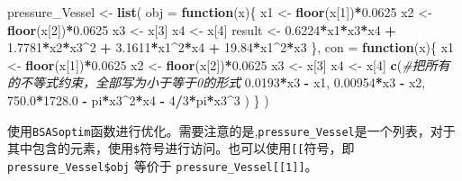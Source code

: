 \documentclass[]{ctexbook}
\newenvironment{Shaded}{\begin{snugshade}}{\end{snugshade}}
\newcommand{\KeywordTok}[1]{\textcolor[rgb]{0.13,0.29,0.53}{\textbf{#1}}}
\newcommand{\DataTypeTok}[1]{\textcolor[rgb]{0.13,0.29,0.53}{#1}}
\newcommand{\DecValTok}[1]{\textcolor[rgb]{0.00,0.00,0.81}{#1}}
\newcommand{\FloatTok}[1]{\textcolor[rgb]{0.00,0.00,0.81}{#1}}
\newcommand{\StringTok}[1]{\textcolor[rgb]{0.31,0.60,0.02}{#1}}
\newcommand{\CommentTok}[1]{\textcolor[rgb]{0.56,0.35,0.01}{\textit{#1}}}
\newcommand{\ControlFlowTok}[1]{\textcolor[rgb]{0.13,0.29,0.53}{\textbf{#1}}}
\newcommand{\OperatorTok}[1]{\textcolor[rgb]{0.81,0.36,0.00}{\textbf{#1}}}
\newcommand{\NormalTok}[1]{#1}
\begin{document}
\begin{Shaded}
\begin{Highlighting}[]
\NormalTok{pressure_Vessel <-}\StringTok{ }\KeywordTok{list}\NormalTok{(}
  \DataTypeTok{obj =} \ControlFlowTok{function}\NormalTok{(x)\{}
\NormalTok{    x1 <-}\StringTok{ }\KeywordTok{floor}\NormalTok{(x[}\DecValTok{1}\NormalTok{])}\OperatorTok{*}\FloatTok{0.0625}
\NormalTok{    x2 <-}\StringTok{ }\KeywordTok{floor}\NormalTok{(x[}\DecValTok{2}\NormalTok{])}\OperatorTok{*}\FloatTok{0.0625}
\NormalTok{    x3 <-}\StringTok{ }\NormalTok{x[}\DecValTok{3}\NormalTok{]}
\NormalTok{    x4 <-}\StringTok{ }\NormalTok{x[}\DecValTok{4}\NormalTok{]}
\NormalTok{    result <-}\StringTok{ }\FloatTok{0.6224}\OperatorTok{*}\NormalTok{x1}\OperatorTok{*}\NormalTok{x3}\OperatorTok{*}\NormalTok{x4 }\OperatorTok{+}\StringTok{ }
\StringTok{      }\FloatTok{1.7781}\OperatorTok{*}\NormalTok{x2}\OperatorTok{*}\NormalTok{x3}\OperatorTok{^}\DecValTok{2} \OperatorTok{+}
\StringTok{      }\FloatTok{3.1611}\OperatorTok{*}\NormalTok{x1}\OperatorTok{^}\DecValTok{2}\OperatorTok{*}\NormalTok{x4 }\OperatorTok{+}\StringTok{ }
\StringTok{      }\FloatTok{19.84}\OperatorTok{*}\NormalTok{x1}\OperatorTok{^}\DecValTok{2}\OperatorTok{*}\NormalTok{x3}
\NormalTok{  \},}
  \DataTypeTok{con =} \ControlFlowTok{function}\NormalTok{(x)\{}
\NormalTok{    x1 <-}\StringTok{ }\KeywordTok{floor}\NormalTok{(x[}\DecValTok{1}\NormalTok{])}\OperatorTok{*}\FloatTok{0.0625}
\NormalTok{    x2 <-}\StringTok{ }\KeywordTok{floor}\NormalTok{(x[}\DecValTok{2}\NormalTok{])}\OperatorTok{*}\FloatTok{0.0625}
\NormalTok{    x3 <-}\StringTok{ }\NormalTok{x[}\DecValTok{3}\NormalTok{]}
\NormalTok{    x4 <-}\StringTok{ }\NormalTok{x[}\DecValTok{4}\NormalTok{]}
    \KeywordTok{c}\NormalTok{(}\CommentTok{#把所有的不等式约束，全部写为小于等于0的形式}
      \FloatTok{0.0193}\OperatorTok{*}\NormalTok{x3 }\OperatorTok{-}\StringTok{ }\NormalTok{x1,}
      \FloatTok{0.00954}\OperatorTok{*}\NormalTok{x3 }\OperatorTok{-}\StringTok{ }\NormalTok{x2,}
      \FloatTok{750.0}\OperatorTok{*}\FloatTok{1728.0} \OperatorTok{-}\StringTok{ }\NormalTok{pi}\OperatorTok{*}\NormalTok{x3}\OperatorTok{^}\DecValTok{2}\OperatorTok{*}\NormalTok{x4 }\OperatorTok{-}\StringTok{ }\DecValTok{4}\OperatorTok{/}\DecValTok{3}\OperatorTok{*}\NormalTok{pi}\OperatorTok{*}\NormalTok{x3}\OperatorTok{^}\DecValTok{3}
\NormalTok{    )}
\NormalTok{  \}}
\NormalTok{)}
\end{Highlighting}
\end{Shaded}

使用\texttt{BSASoptim}函数进行优化。需要注意的是,\texttt{pressure\_Vessel}是一个列表，对于其中包含的元素，使用\texttt{\$}符号进行访问。也可以使用\texttt{{[}{[}}符号，即
\texttt{pressure\_Vessel\$obj} 等价于
\texttt{pressure\_Vessel{[}{[}1{]}{]}}。
\end{document}
